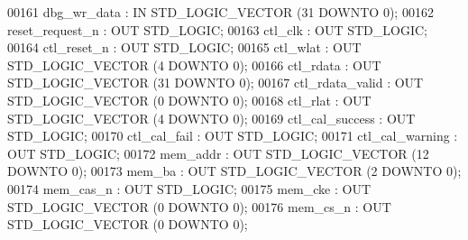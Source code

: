 \begin{DoxyCode}
{00161         dbg\_wr\_data : \textcolor{keywordflow}{IN} \textcolor{comment}{STD\_LOGIC\_VECTOR} (\textcolor{vhdllogic}{}\textcolor{vhdllogic}{31} \textcolor{keywordflow}{DOWNTO} \textcolor{vhdllogic}{}\textcolor{vhdllogic}{0});
00162         reset\_request\_n : \textcolor{keywordflow}{OUT} \textcolor{comment}{STD\_LOGIC};
00163         ctl\_clk : \textcolor{keywordflow}{OUT} \textcolor{comment}{STD\_LOGIC};
00164         ctl\_reset\_n : \textcolor{keywordflow}{OUT} \textcolor{comment}{STD\_LOGIC};
00165         ctl\_wlat    : \textcolor{keywordflow}{OUT} \textcolor{comment}{STD\_LOGIC\_VECTOR} (\textcolor{vhdllogic}{}\textcolor{vhdllogic}{4} \textcolor{keywordflow}{DOWNTO} \textcolor{vhdllogic}{}\textcolor{vhdllogic}{0});
00166         ctl\_rdata   : \textcolor{keywordflow}{OUT} \textcolor{comment}{STD\_LOGIC\_VECTOR} (\textcolor{vhdllogic}{}\textcolor{vhdllogic}{31} \textcolor{keywordflow}{DOWNTO} \textcolor{vhdllogic}{}\textcolor{vhdllogic}{0});
00167         ctl\_rdata\_valid : \textcolor{keywordflow}{OUT} \textcolor{comment}{STD\_LOGIC\_VECTOR} (\textcolor{vhdllogic}{}\textcolor{vhdllogic}{0} \textcolor{keywordflow}{DOWNTO} \textcolor{vhdllogic}{}\textcolor{vhdllogic}{0});
00168         ctl\_rlat    : \textcolor{keywordflow}{OUT} \textcolor{comment}{STD\_LOGIC\_VECTOR} (\textcolor{vhdllogic}{}\textcolor{vhdllogic}{4} \textcolor{keywordflow}{DOWNTO} \textcolor{vhdllogic}{}\textcolor{vhdllogic}{0});
00169         ctl\_cal\_success : \textcolor{keywordflow}{OUT} \textcolor{comment}{STD\_LOGIC};
00170         ctl\_cal\_fail    : \textcolor{keywordflow}{OUT} \textcolor{comment}{STD\_LOGIC};
00171         ctl\_cal\_warning : \textcolor{keywordflow}{OUT} \textcolor{comment}{STD\_LOGIC};
00172         mem\_addr    : \textcolor{keywordflow}{OUT} \textcolor{comment}{STD\_LOGIC\_VECTOR} (\textcolor{vhdllogic}{}\textcolor{vhdllogic}{12} \textcolor{keywordflow}{DOWNTO} \textcolor{vhdllogic}{}\textcolor{vhdllogic}{0});
00173         mem\_ba  : \textcolor{keywordflow}{OUT} \textcolor{comment}{STD\_LOGIC\_VECTOR} (\textcolor{vhdllogic}{}\textcolor{vhdllogic}{2} \textcolor{keywordflow}{DOWNTO} \textcolor{vhdllogic}{}\textcolor{vhdllogic}{0});
00174         mem\_cas\_n   : \textcolor{keywordflow}{OUT} \textcolor{comment}{STD\_LOGIC};
00175         mem\_cke : \textcolor{keywordflow}{OUT} \textcolor{comment}{STD\_LOGIC\_VECTOR} (\textcolor{vhdllogic}{}\textcolor{vhdllogic}{0} \textcolor{keywordflow}{DOWNTO} \textcolor{vhdllogic}{}\textcolor{vhdllogic}{0});
00176         mem\_cs\_n    : \textcolor{keywordflow}{OUT} \textcolor{comment}{STD\_LOGIC\_VECTOR} (\textcolor{vhdllogic}{}\textcolor{vhdllogic}{0} \textcolor{keywordflow}{DOWNTO} \textcolor{vhdllogic}{}\textcolor{vhdllogic}{0});
}
\end{DoxyCode}
